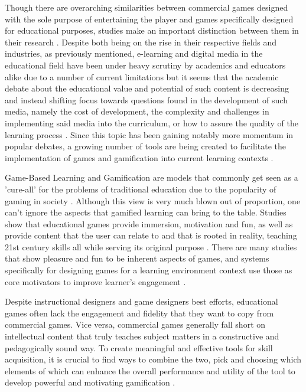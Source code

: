 Though there are overarching similarities between commercial games designed with the sole purpose of entertaining the player and games specifically designed for educational purposes, studies make an important distinction between them in their research \cite{domestic}.
Despite both being on the rise in their respective fields and industries, as previously mentioned, e-learning and digital media in the educational field have been under heavy scrutiny by academics and educators alike due to a number of current limitations but it seems that the academic debate about the educational value and potential of such content is decreasing and instead shifting focus towards questions found in the development of such media, namely the cost of development, the complexity and challenges in implementing said media into the curriculum, or how to assure the quality of the learning process \cite{online}.
Since this topic has been gaining notably more momentum in popular debates, a growing number of tools are being created to facilitate the implementation of games and gamification into current learning contexts \cite{online}.

Game-Based Learning and Gamification are models that commonly get seen as a 'cure-all' for the problems of traditional education due to the popularity of gaming in society \cite{traditional}. Although this view is very much blown out of proportion, one can't ignore the aspects that gamified learning can bring to the table. Studies show that educational games provide immersion, motivation and fun, as well as provide content that the user can relate to and that is rooted in reality, teaching 21st century skills all while serving its original purpose \cite{framework}.
There are many studies that show pleasure and fun to be inherent aspects of games, and systems specifically for designing games for a learning environment context use those as core motivators to improve learner's engagement \cite{compare}.

Despite instructional designers and game designers best efforts, educational games often lack the engagement and fidelity that they want to copy from commercial games. Vice versa, commercial games generally fall short on intellectual content that truly teaches subject matters in a constructive and pedagogically sound way.
To create meaningful and effective tools for skill acquisition, it is crucial to find ways to combine the two, pick and choosing which elements of which can enhance the overall performance and utility of the tool to develop powerful and motivating gamification \cite{traditional}.